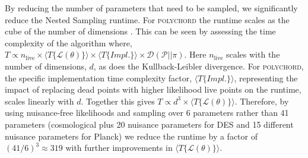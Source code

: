 By reducing the number of parameters that need to be sampled, we significantly reduce the Nested Sampling runtime. For \textsc{polychord} the runtime scales as the cube of the number of dimensions \cite{supernest}. This can be seen by assessing the time complexity of the algorithm where, $T \propto n_\mathrm{live} \times \langle T\{\mathcal{L}(\theta)\}\rangle \times \langle T\{Impl.\}\rangle \times \mathcal{D}(\mathcal{P}||\pi)$. Here $n_\mathrm{live}$ scales with the number of dimensions, $d$, as does the Kullback-Leibler divergence. For \textsc{polychord}, the specific implementation time complexity factor, $\langle T\{Impl.\}\rangle$, representing the impact of replacing dead points with higher likelihood live points on the runtime, scales linearly with $d$. Together this gives $T \propto d^3 \times \langle T\{\mathcal{L}(\theta)\}\rangle$. Therefore, by using nuisance-free likelihoods and sampling over 6 parameters rather than 41 parameters (cosmological plus 20 nuisance parameters for DES and 15 different nuisance parameters for Planck) we reduce the runtime by a factor of $(41/6)^3 \approx 319$ with further improvements in $\langle T\{\mathcal{L}(\theta)\}\rangle$. %

